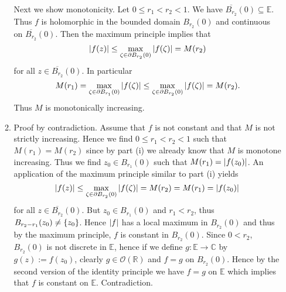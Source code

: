 \begin{enumerate}[label = \textbf{Exercise \arabic*.},wide = 0pt, itemsep=1.5ex]
\begin{enumerate}[label = (\roman*),wide = 0pt, itemsep=1.5ex]
	Next we show monotonicity. Let $0 \leq r_1 < r_2 < 1$. We have $\overline{B_{r_2}}(0) \subseteq \mathbb{E}$. Thus $f$ is holomorphic in the bounded domain $B_{r_2}(0)$ and continuous on $\overline{B_{r_2}}(0)$. Then the maximum principle implies that 
				\begin{equation}
					\abs[0]{f(z)} \leq \max_{\zeta \in \partial B_{r_2}(0)}\abs[0]{f(\zeta)} = M(r_2)
				\end{equation}
				\noindent for all $z \in \overline{B_{r_2}}(0)$. In particular 
				\begin{equation}
					M(r_1) = \max_{\zeta \in \partial B_{r_1}(0)}\abs[0]{f(\zeta)} \leq \max_{\zeta \in \partial B_{r_2}(0)}\abs[0]{f(\zeta)} = M(r_2).
				\end{equation}
				Thus $M$ is monotonically increasing.
			\item Proof by contradiction. Assume that $f$ is not constant and that $M$ is not strictly increasing. Hence we find $0 \leq r_1 < r_2 < 1$ such that $M(r_1) = M(r_2)$ since by part (i) we already know that $M$ is monotone increasing. Thus we find $z_0 \in B_{r_1}(0)$ such that $M(r_1) = \abs[0]{f(z_0)}$. An application of the maximum principle similar to part (i) yields
				\begin{equation}
					\abs[0]{f(z)} \leq \max_{\zeta \in \partial B_{r_2}(0)}	\abs[0]{f(\zeta)} = M(r_2) = M(r_1) = \abs[0]{f(z_0)}
				\end{equation}
				\noindent for all $z \in \overline{B_{r_2}}(0)$. But $z_0 \in B_{r_1}(0)$ and $r_1 < r_2$, thus $B_{r_2 - r_1}(z_0) \neq \cbr[0]{z_0}$. Hence $\abs[0]{f}$ has a local maximum in $B_{r_2}(0)$ and thus by the maximum principle, $f$ is constant in $B_{r_2}(0)$. Since $0 < r_2$, $B_{r_2}(0)$ is not discrete in $\mathbb{E}$, hence if we define $g: \mathbb{E} \to \mathbb{C}$ by $g(z) := f(z_0)$, clearly $g \in \mathcal{O}(\mathbb{R})$ and $f = g$ on $B_{r_2}(0)$. Hence by the second version of the identity principle we have $f = g$ on $\mathbb{E}$ which implies that $f$ is constant on $\mathbb{E}$. Contradiction. 
		\end{enumerate}


\end{enumerate}
